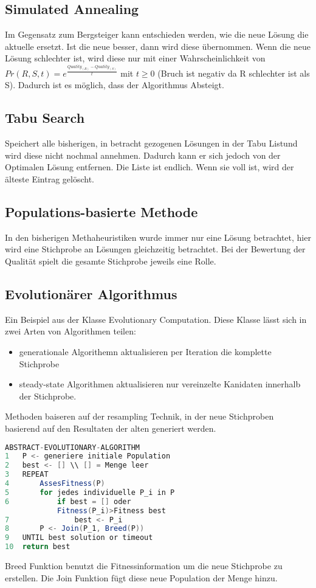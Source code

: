 \documentclass[jou,apacite]{apa6}
\begin{document}
\subsection{Simulated Annealing}
Im Gegensatz zum Bergsteiger kann entschieden werden, wie die neue Lösung die aktuelle ersetzt. Ist die neue besser, dann wird diese übernommen. Wenn die neue Lösung schlechter ist, wird diese nur mit einer Wahrscheinlichkeit von $Pr(R, S, t) = e^{\frac{Quality_{(R)}-Quality_{(S)}}{t}}$ mit $t \ge 0$ (Bruch ist negativ da R schlechter ist als S). Dadurch ist es möglich, dass der Algorithmus \dq Absteigt\dq .

\subsection{Tabu Search}
Speichert alle bisherigen, in betracht gezogenen Lösungen in der \dq Tabu List\dq  und wird diese nicht nochmal annehmen. Dadurch kann er sich jedoch von der Optimalen Lösung entfernen. Die Liste ist endlich. Wenn sie voll ist, wird der älteste Eintrag gelöscht.

\subsection{Populations-basierte Methode}
In den bisherigen Methaheuristiken wurde immer nur eine Lösung betrachtet, hier wird eine Stichprobe an Lösungen gleichzeitig betrachtet. Bei der Bewertung der Qualität spielt die gesamte Stichprobe jeweils eine Rolle. 

\subsection{Evolutionärer Algorithmus}
Ein Beispiel aus der Klasse \dq Evolutionary Computation\dq . Diese Klasse lässt sich in zwei Arten von Algorithmen teilen: 
\begin{itemize}
    \item generationale Algorithemn aktualisieren per Iteration die komplette Stichprobe
    \item steady-state Algorithmen aktualisieren nur vereinzelte Kanidaten innerhalb der Stichprobe. 
\end{itemize}
Methoden baiseren auf der resampling Technik, in der neue Stichproben basierend auf den Resultaten der alten generiert werden. 

\begin{lstlisting}[language=java]
ABSTRACT-EVOLUTIONARY-ALGORITHM
1   P <- generiere initiale Population
2   best <- [] \\ [] = Menge leer
3   REPEAT
4       AssesFitness(P)
5       for jedes individuelle P_i in P
6           if best = [] oder 
            Fitness(P_i)>Fitness best 
7               best <- P_i
8       P <- Join(P_1, Breed(P))
9   UNTIL best solution or timeout
10  return best
\end{lstlisting}
Breed Funktion benutzt die Fitnessinformation um die neue Stichprobe zu erstellen. Die Join Funktion fügt diese neue Population der Menge hinzu. \\
\end{document}
